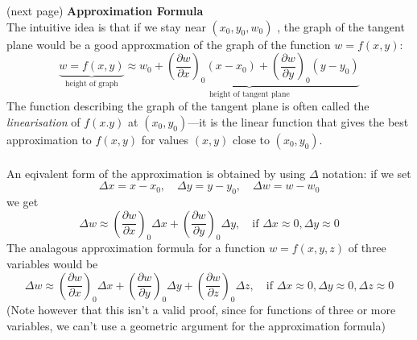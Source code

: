 \documentclass{report}
\begin{document}
(next page)
\newpage
\noindent\textbf{Approximation Formula}\\
The intuitive idea is that if we stay near $(x_0,y_0,w_0)$
, the graph of the tangent plane would be a good approxmation of the graph of the function $w=f(x,y)$:
\begin{equation*}
\underbrace{w=f(x,y)}_{\text{height of graph}}
\approx\underbrace{w_0+\left(\frac{\partial w}{\partial x}\right)_0(x-x_0)+
\left(\frac{\partial w}{\partial y}\right)_0(y-y_0)}_
{\text{height of tangent plane}}
\end{equation*}
The function describing the graph of the tangent plane is often called the \textit{linearisation} of $f(x.y)$ at
$(x_0,y_0)$---it is the linear function that gives the best approximation to $f(x,y)$ for values $(x,y)$ 
close to $(x_0,y_0)$.\\
\vspace{1mm}\\
An eqivalent form of the approximation is obtained by using $\Delta$ notation: if we set
\begin{equation*}
\Delta x=x-x_0,\quad\Delta y=y-y_0,\quad\Delta w=w-w_0
\end{equation*}
we get
\begin{equation*}
\Delta w\approx\left(\frac{\partial w}{\partial x}\right)_0\Delta x+
\left(\frac{\partial w}{\partial y}\right)_0\Delta y,
\quad\text{if }\Delta x\approx0,\Delta y\approx0
\end{equation*}
The analagous approximation formula for a function $w=f(x,y,z)$ of three variables would be
\begin{equation*}
\Delta w\approx\left(\frac{\partial w}{\partial x}\right)_0\Delta x+
\left(\frac{\partial w}{\partial y}\right)_0\Delta y+
\left(\frac{\partial w}{\partial z}\right)_0\Delta z,
\quad\text{if }\Delta x\approx0,\Delta y\approx0
,\Delta z\approx0
\end{equation*}
(Note however that this isn't a valid proof, since for functions of three or more variables, 
we can't use a geometric argument for the approximation formula)
\newpage
\end{document}
